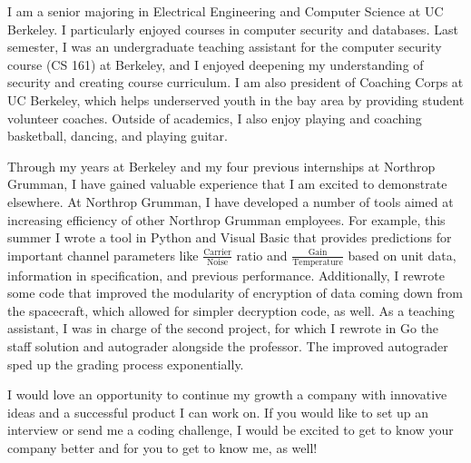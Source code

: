 \documentclass[11pt, a4paper]{awesome-cv}
\begin{document}
\makecvheader

\makelettertitle

\begin{cvletter}
I am a senior majoring in Electrical Engineering and Computer Science at UC Berkeley. I particularly enjoyed courses in computer security and databases. Last semester, I was an undergraduate teaching assistant for the computer security course (CS 161) at Berkeley, and I enjoyed deepening my understanding of security and creating course curriculum. I am also president of Coaching Corps at UC Berkeley, which helps underserved youth in the bay area by providing student volunteer coaches. Outside of academics, I also enjoy playing and coaching basketball, dancing, and playing guitar.

Through my years at Berkeley and my four previous internships at Northrop Grumman, I have gained valuable experience that I am excited to demonstrate elsewhere. At Northrop Grumman, I have developed a number of tools aimed at increasing efficiency of other Northrop Grumman employees. For example, this summer I wrote a tool in Python and Visual Basic that provides predictions for important channel parameters like $\frac{\text{Carrier}}{\text{Noise}}$ ratio and $\frac{\text{Gain}}{\text{Temperature}}$ based on unit data, information in specification, and previous performance. Additionally, I rewrote some code that improved the modularity of encryption of data coming down from the spacecraft, which allowed for simpler decryption code, as well. As a teaching assistant, I was in charge of the second project, for which I rewrote in Go the staff solution and autograder alongside the professor. The improved autograder sped up the grading process exponentially.

I would love an opportunity to continue my growth a company with innovative ideas and a successful product I can work on. If you would like to set up an interview or send me a coding challenge, I would be excited to get to know your company better and for you to get to know me, as well!

\end{cvletter}

\makeletterclosing
\end{document}
